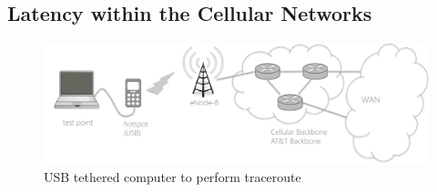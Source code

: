 \subsection{Latency within the Cellular Networks}
\label{sec:latency-with-celull}

\begin{figure}
  \centering
  \includegraphics[width=\linewidth]{../figs/mobile_networks_method.pdf}
  \caption{USB tethered computer to perform traceroute}
  \label{fig:mobile_networks_method}
\end{figure}

